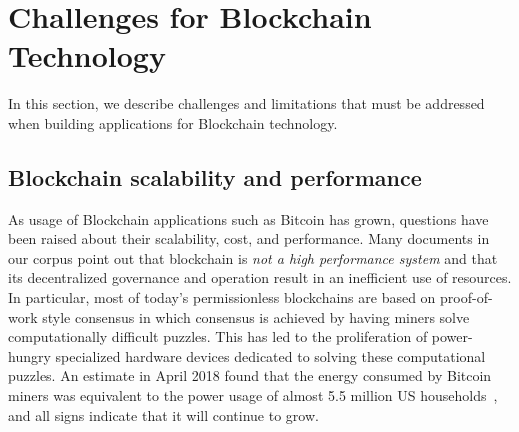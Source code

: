 

\section{Challenges for Blockchain Technology}
\label{sec:challenges}

In this section, we describe challenges and limitations that must be addressed when building applications for Blockchain technology.

\subsection{Blockchain scalability and performance}
As usage of Blockchain applications such as Bitcoin has grown, questions have been raised about their scalability, cost, and performance. Many documents in our corpus point out that blockchain is \emph{not a high performance system} and that its decentralized governance and operation result in an inefficient use of resources.  In particular, most of today's permissionless blockchains are based on proof-of-work style consensus in which consensus is achieved by having miners solve computationally difficult puzzles. This has led to the proliferation of power-hungry specialized hardware devices dedicated to solving these computational puzzles. An estimate in April 2018 found that the energy consumed by Bitcoin miners was equivalent to the power usage of almost 5.5 million US households~\cite{Digiconomist}, and all signs indicate that it will continue to grow.

